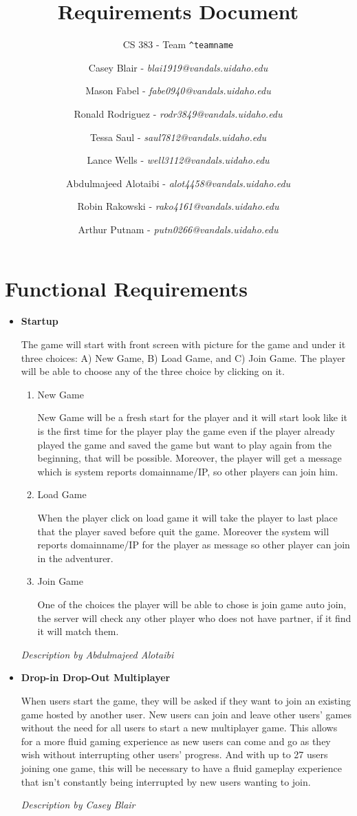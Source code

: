 \documentclass[12pt]{article}
\title{Requirements Document}
\subtitle{CS 383 - Team \texttt{\textasciicircum teamname}}
\author{
Casey Blair - \textit{blai1919@vandals.uidaho.edu} \\
\and Mason Fabel - \textit{fabe0940@vandals.uidaho.edu} \\
\and Ronald Rodriguez - \textit{rodr3849@vandals.uidaho.edu} \\
\and Tessa Saul - \textit{saul7812@vandals.uidaho.edu} \\
\and Lance Wells - \textit{well3112@vandals.uidaho.edu} \\
\and Abdulmajeed Alotaibi - \textit{alot4458@vandals.uidaho.edu} \\
\and Robin Rakowski - \textit{rako4161@vandals.uidaho.edu} \\
\and Arthur Putnam - \textit{putn0266@vandals.uidaho.edu} \\
}
\begin{document}
\maketitle

\section{Functional Requirements}
\begin{itemize}
	\item \textbf{Startup}
	
	The game will start with front screen with picture for the game and under
	it three choices: A) New Game, B) Load Game, and C) Join Game. The player
	will be able to choose any of the three choice by clicking on it.

	\begin{enumerate}
	\item New Game

	New Game will be a fresh start for the player and it will start look like
	it is the first time for the player play the game even if the player
	already played the game and saved the game but want to play again from the
	beginning, that will be possible. Moreover, the player will get a message
	which is system reports domainname/IP, so other players can join him.

	\item Load Game

	When the player click on load game it will take the player to last place
	that the player saved before quit the game. Moreover the system will
	reports domainname/IP for the player as message so other player can join in
	the adventurer.

	\item Join Game

	One of the choices the player will be able to chose is join game auto join,
	the server will check any other player who does not have partner, if it
	find it will match them.
	\end{enumerate}
	
	\emph{Description by Abdulmajeed Alotaibi}
	
	\item \textbf{Drop-in Drop-Out Multiplayer}
	
	 When users start the game, they will be asked if they want to join an existing game hosted by another user. New users can join and leave other users’ games without the need for all users to start a new multiplayer game. This allows
for a more fluid gaming experience as new users can come and go as they wish without interrupting other users’ progress. And with up to 27 users joining one game, this will be necessary to have a fluid gameplay experience that isn’t constantly being interrupted by new users wanting to
join.

\emph{Description by Casey Blair}
\end{itemize}
\end{document}
